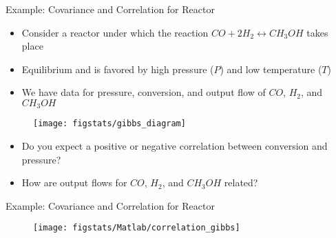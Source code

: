 \documentclass[9pt]{beamer}
\begin{document}
%
\begin{frame}{Example: Covariance and Correlation for Reactor}

\begin{itemize}
\item Consider a reactor under which the reaction $CO+2H_2\leftrightarrow CH_3OH$ takes place
\item Equilibrium and is favored by high pressure ($P$) and low temperature ($T$)
\item We have data for pressure, conversion, and output flow of $CO$, $H_2$, and $CH_3OH$
\end{itemize}

\begin{figure}[!htb]
    \centering
	\texttt{[image: figstats/gibbs\_diagram]}
\end{figure}

\begin{block}{}
\begin{itemize}
\item Do you expect a positive or negative correlation between conversion and pressure?
 \item How are output flows for $CO$, $H_2$, and $CH_3OH$ related?
\end{itemize}
\end{block}

\end{frame}


%
\begin{frame}{Example: Covariance and Correlation for Reactor}


\begin{figure}[!htb]
    \centering
	\texttt{[image: figstats/Matlab/correlation\_gibbs]}
\end{figure}



\end{frame}
\end{document}
